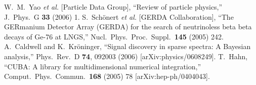 \documentclass[11pt, a4paper]{article}
\begin{document}

\begin{thebibliography}{99}
%
  W.~M.~Yao {\it et al.}  [Particle Data Group],
  ``Review of particle physics,''
  J.\ Phys.\ G {\bf 33} (2006) 1.
%
  S.~Sch\"onert {\it et al.}  [GERDA Collaboration],
  ``The GERmanium Detector Array (GERDA) for the search of neutrinoless beta
  beta decays of Ge-76 at LNGS,''
  Nucl.\ Phys.\ Proc.\ Suppl.\  {\bf 145} (2005) 242.
%
  A.~Caldwell and K.~Kr\"oninger,
  ``Signal discovery in sparse spectra: A Bayesian analysis,''
  Phys.\ Rev.\  D {\bf 74}, 092003 (2006)
  [arXiv:physics/0608249].
%
  T.~Hahn, ``CUBA: A library for multidimensional numerical
  integration,'' Comput.\ Phys.\ Commun.\ {\bf 168} (2005) 78
  [arXiv:hep-ph/0404043].
\end{thebibliography}
\end{document}
